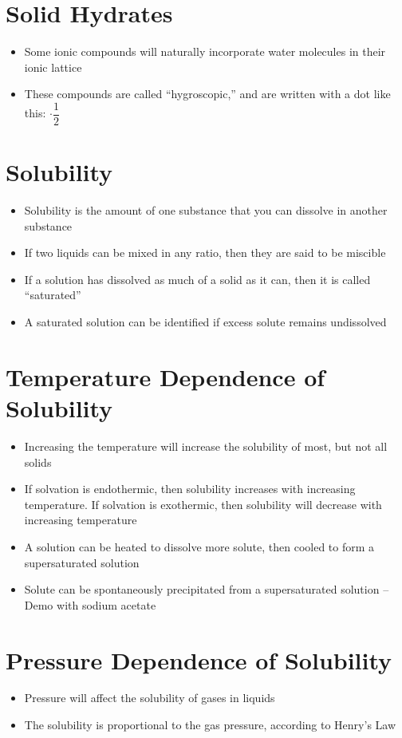 \documentclass[12pt, openany, letterpaper]{memoir}
\begin{document}
\section*{Solid Hydrates}
\begin{itemize}
	\item Some ionic compounds will naturally incorporate water molecules in their ionic lattice
	\item These compounds are called ``hygroscopic,'' and are written with a dot like this: $\cdot \dfrac{1}{2}$ 
\end{itemize}

\section{Solubility}
\begin{itemize}
	\item Solubility is the amount of one substance that you can dissolve in another substance
	\item If two liquids can be mixed in any ratio, then they are said to be miscible
	\item If a solution has dissolved as much of a solid as it can, then it is called ``saturated''
	\item A saturated solution can be identified if excess solute remains undissolved
\end{itemize}

\section{Temperature Dependence of Solubility}
\begin{itemize}
	\item Increasing the temperature will increase the solubility of most, but not all solids
	\item If solvation is endothermic, then solubility increases with increasing temperature. If solvation is exothermic, then solubility will decrease with increasing temperature
	\item A solution can be heated to dissolve more solute, then cooled to form a supersaturated solution
	\item Solute can be spontaneously precipitated from a supersaturated solution -- Demo with sodium acetate
\end{itemize}

\section{Pressure Dependence of Solubility}
\begin{itemize}
	\item Pressure will affect the solubility of gases in liquids
	\item The solubility is proportional to the gas pressure, according to Henry's Law
\end{itemize}
\end{document}
